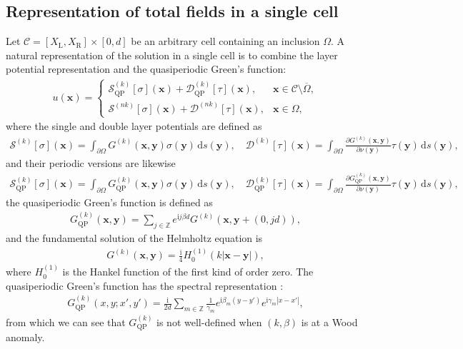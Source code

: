 \documentclass[11pt,fleqn]{article}
\newcommand{\ii}{\mathrm{i}}
\newcommand{\dd}{\mathrm{d}}
\theoremstyle{definition}
\theoremstyle{remark}
\begin{document}
\subsection{Representation of total fields in a single cell}
Let $\mathcal C=[X_\mathrm{L},X_\mathrm{R}]\times[0,d]$ be an arbitrary cell
containing an inclusion $\Omega$.
A natural representation of the solution in a single cell is to combine the layer potential representation and the quasiperiodic Green's function: \begin{align*}
  u(\mathbf{x}) = \begin{cases}
    \mathcal{S}^{(k)}_{\mathrm{QP}}[\sigma](\mathbf{x}) + \mathcal{D}^{(k)}_{\mathrm{QP}}[\tau](\mathbf{x}), & \mathbf{x} \in \mathcal{C}\setminus \overline{\Omega},\\
    \mathcal{S}^{(nk)}[\sigma](\mathbf{x}) + \mathcal{D}^{(nk)}[\tau](\mathbf{x}), & \mathbf{x} \in \Omega,
  \end{cases}
\end{align*}
where the single and double layer potentials are defined as \begin{align*}
  \mathcal{S}^{(k)}[\sigma](\mathbf{x}) = \int_{\partial \Omega} G^{(k)}(\mathbf{x},\mathbf{y}) \sigma(\mathbf{y})\, \dd s(\mathbf{y}),\quad
  \mathcal{D}^{(k)}[\tau](\mathbf{x}) = \int_{\partial \Omega} \frac{\partial G^{(k)}(\mathbf{x},\mathbf{y})}{\partial \nu(\mathbf{y})} \tau(\mathbf{y})\, \dd s(\mathbf{y}),
\end{align*}
and their periodic versions are likewise \begin{align*}
  \mathcal{S}^{(k)}_{\mathrm{QP}}[\sigma](\mathbf{x}) = \int_{\partial \Omega} G^{(k)}_{\mathrm{QP}}(\mathbf{x},\mathbf{y}) \sigma(\mathbf{y})\, \dd s(\mathbf{y}),\quad
  \mathcal{D}^{(k)}_{\mathrm{QP}}[\tau](\mathbf{x}) = \int_{\partial \Omega} \frac{\partial G^{(k)}_{\mathrm{QP}}(\mathbf{x},\mathbf{y})}{\partial \nu(\mathbf{y})} \tau(\mathbf{y})\, \dd s(\mathbf{y}),
\end{align*}
the quasiperiodic Green's function is defined as \begin{align}
  G^{(k)}_{\mathrm{QP}}(\mathbf{x},\mathbf{y}) = \sum_{j\in\mathbb{Z}} e^{\ii j \beta d} G^{(k)}(\mathbf{x},\mathbf{y} + (0,jd)), \label{eq:lattice-sum-qpgreen}
\end{align}
and the fundamental solution of the Helmholtz equation is \begin{align*}
  G^{(k)}(\mathbf{x},\mathbf{y}) = \frac{\ii}{4} H_0^{(1)}(k|\mathbf{x}-\mathbf{y}|),
\end{align*}
where $H_0^{(1)}$ is the Hankel function of the first kind of order zero.
The quasiperiodic Green's function has the spectral representation \cite{Linton1998}:
\begin{align}
  G_\mathrm{QP}^{(k)}(x,y;x',y') = \frac{\ii}{2d} \sum_{m\in\mathbb{Z}} \frac{1}{\gamma_m} e^{\ii \beta_m (y - y')} e^{\ii \gamma_m |x - x'|}, \label{eq:qp-green-spectral}
\end{align}
from which we can see that $G_\mathrm{QP}^{(k)}$ is not well-defined when $(k,\beta)$ is at a Wood anomaly. 
\end{document}
